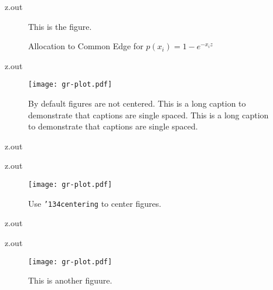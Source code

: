 \MyIO


\begin{VerbatimOut}{z.out}

\begin{figure}
  This is the figure.
  \caption{%
    Allocation to Common Edge for
    \(p(x_i) = 1-e^{-x_iz}\)%
  }
\end{figure}
\end{VerbatimOut}

\MyIO



\begin{VerbatimOut}{z.out}

\begin{figure}[ht]
  \texttt{[image: gr-plot.pdf]}
  \caption
  {%
    By default figures are not centered.
    This is a long caption to demonstrate that captions are single spaced.
    This is a long caption to demonstrate that captions are single spaced.%
  }
  \label{fi:not-centered}
\end{figure}
\end{VerbatimOut}

\MyIO


\begin{VerbatimOut}{z.out}

\end{VerbatimOut}

\MyIO


\begin{VerbatimOut}{z.out}

\begin{figure}[ht]
  \centering
  \texttt{[image: gr-plot.pdf]}
  \caption{Use {\tt \char'134centering\/} to center figures.}
  \label{fi:centered}
\end{figure}
\end{VerbatimOut}

\MyIO


\begin{VerbatimOut}{z.out}

\end{VerbatimOut}

\MyIO


\begin{VerbatimOut}{z.out}

\begin{figure}[ht]
  \centering
  \texttt{[image: gr-plot.pdf]}
  \caption{This is another figuure.}
  \label{fi:another}
\end{figure}
\end{VerbatimOut}

